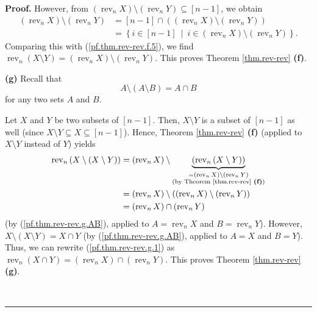 \documentclass[numbers=enddot,12pt,final,onecolumn,notitlepage]{scrartcl}%
\theoremstyle{definition}
\newenvironment{proof}[1][Proof]{\noindent\textbf{#1.} }{\ \rule{0.5em}{0.5em}}
\begin{document}
\begin{proof}
However, from $\left(  \operatorname*{rev}\nolimits_{n}X\right)
\setminus\left(  \operatorname*{rev}\nolimits_{n}Y\right)  \subseteq\left[
n-1\right]  $, we obtain%
\begin{align*}
\left(  \operatorname*{rev}\nolimits_{n}X\right)  \setminus\left(
\operatorname*{rev}\nolimits_{n}Y\right)   &  =\left[  n-1\right]  \cap\left(
\left(  \operatorname*{rev}\nolimits_{n}X\right)  \setminus\left(
\operatorname*{rev}\nolimits_{n}Y\right)  \right) \\
&  =\left\{  i\in\left[  n-1\right]  \ \mid\ i\in\left(  \operatorname*{rev}%
\nolimits_{n}X\right)  \setminus\left(  \operatorname*{rev}\nolimits_{n}%
Y\right)  \right\}  .
\end{align*}
Comparing this with (\ref{pf.thm.rev-rev.f.5}), we find $\operatorname*{rev}%
\nolimits_{n}\left(  X\setminus Y\right)  =\left(  \operatorname*{rev}%
\nolimits_{n}X\right)  \setminus\left(  \operatorname*{rev}\nolimits_{n}%
Y\right)  $. This proves Theorem \ref{thm.rev-rev} \textbf{(f)}. \medskip

\textbf{(g)} Recall that
\begin{equation}
A\setminus\left(  A\setminus B\right)  =A\cap B \label{pf.thm.rev-rev.g.AB}%
\end{equation}
for any two sets $A$ and $B$.

Let $X$ and $Y$ be two subsets of $\left[  n-1\right]  $. Then, $X\setminus Y$
is a subset of $\left[  n-1\right]  $ as well (since $X\setminus Y\subseteq
X\subseteq\left[  n-1\right]  $). Hence, Theorem \ref{thm.rev-rev}
\textbf{(f)} (applied to $X\setminus Y$ instead of $Y$) yields%
\begin{align}
\operatorname*{rev}\nolimits_{n}\left(  X\setminus\left(  X\setminus Y\right)
\right)   &  =\left(  \operatorname*{rev}\nolimits_{n}X\right)  \setminus
\underbrace{\left(  \operatorname*{rev}\nolimits_{n}\left(  X\setminus
Y\right)  \right)  }_{\substack{=\left(  \operatorname*{rev}\nolimits_{n}%
X\right)  \setminus\left(  \operatorname*{rev}\nolimits_{n}Y\right)
\\\text{(by Theorem \ref{thm.rev-rev} \textbf{(f)})}}}\nonumber\\
&  =\left(  \operatorname*{rev}\nolimits_{n}X\right)  \setminus\left(  \left(
\operatorname*{rev}\nolimits_{n}X\right)  \setminus\left(  \operatorname*{rev}%
\nolimits_{n}Y\right)  \right) \nonumber\\
&  =\left(  \operatorname*{rev}\nolimits_{n}X\right)  \cap\left(
\operatorname*{rev}\nolimits_{n}Y\right)  \label{pf.thm.rev-rev.g.1}%
\end{align}
(by (\ref{pf.thm.rev-rev.g.AB}), applied to $A=\operatorname*{rev}%
\nolimits_{n}X$ and $B=\operatorname*{rev}\nolimits_{n}Y$). However,
$X\setminus\left(  X\setminus Y\right)  =X\cap Y$ (by
(\ref{pf.thm.rev-rev.g.AB}), applied to $A=X$ and $B=Y$). Thus, we can rewrite
(\ref{pf.thm.rev-rev.g.1}) as $\operatorname*{rev}\nolimits_{n}\left(  X\cap
Y\right)  =\left(  \operatorname*{rev}\nolimits_{n}X\right)  \cap\left(
\operatorname*{rev}\nolimits_{n}Y\right)  $. This proves Theorem
\ref{thm.rev-rev} \textbf{(g)}. \medskip


\end{proof}
\end{document}
